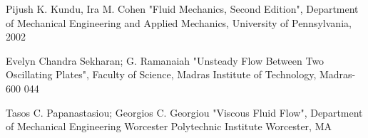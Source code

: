 \documentclass[paper=a4, fontsize=12pt, abstract=on]{scrartcl}
\numberwithin{equation}{section}		%
\numberwithin{figure}{section}			%
\numberwithin{table}{section}				%
\begin{document}
\begin{thebibliography}{99} %
Pijush K. Kundu, Ira M. Cohen
\newblock "Fluid Mechanics, Second Edition",  Department of Mechanical Engineering and Applied Mechanics, University of Pennsylvania, 2002

Evelyn Chandra Sekharan; G. Ramanaiah
\newblock "Unsteady Flow Between Two Oscillating Plates",  Faculty of Science, Madras Institute of Technology, Madras-600 044

Tasos C. Papanastasiou; Georgios C. Georgiou
\newblock "Viscous Fluid Flow",  Department of Mechanical Engineering
Worcester Polytechnic Institute
Worcester, MA

\end{thebibliography}


\end{document}

